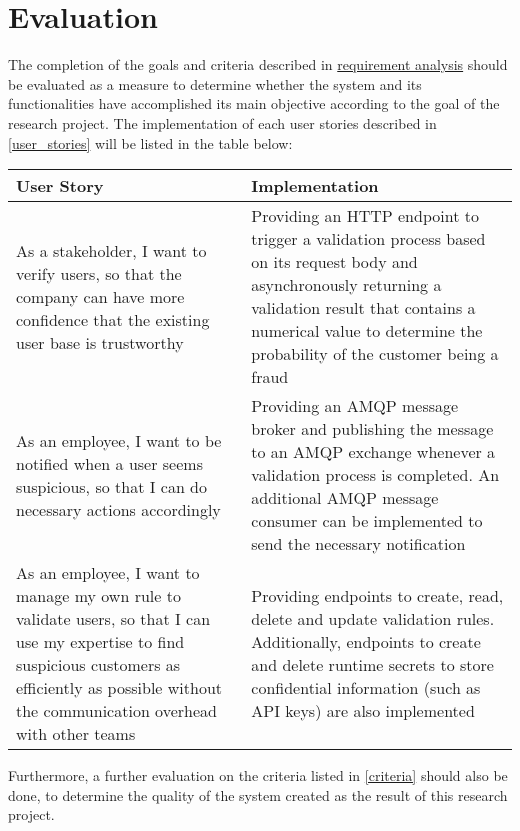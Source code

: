 \section{Evaluation}

  The completion of the goals and criteria described in \hyperref[analysis]{requirement analysis} should be evaluated as a measure to determine whether the system and its functionalities have accomplished its main objective according to the goal of the research project. The implementation of each user stories described in \autoref{user_stories} will be listed in the table below: 
  
  \begin{tabularx}{\linewidth}{p{} p{}}
   \caption{Implementations of the primary use cases of the system} \\
    \toprule
    User Story & Implementation \\
    \midrule
    As a stakeholder, I want to verify users, so that the company can have more confidence that the existing user base is trustworthy & Providing an HTTP endpoint to trigger a validation process based on its request body and asynchronously returning a validation result that contains a numerical value to determine the probability of the customer being a fraud \\

    \hline

    As an employee, I want to be notified when a user seems suspicious, so that I can do necessary actions accordingly & Providing an AMQP message broker and publishing the message to an AMQP exchange whenever a validation process is completed. An additional AMQP message consumer can be implemented to send the necessary notification \\

    \hline 

    As an employee, I want to manage my own rule to validate users, so that I can use my expertise to find suspicious customers as efficiently as possible without the communication overhead with other teams & Providing endpoints to create, read, delete and update validation rules. Additionally, endpoints to create and delete runtime secrets to store confidential information (such as API keys) are also implemented \\
    \bottomrule
  \end{tabularx}

  Furthermore, a further evaluation on the criteria listed in \autoref{criteria} should also be done, to determine the quality of the system created as the result of this research project. 
  
